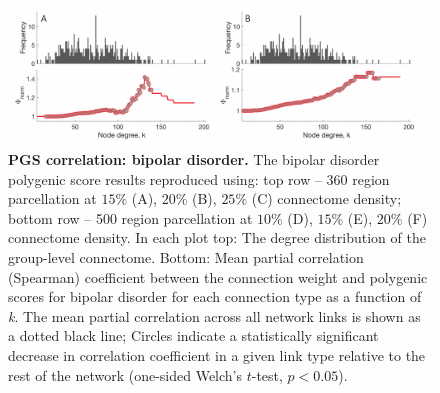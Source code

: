 \begin{figure}[h!]
\begin{center}
\includegraphics[width=1\textwidth]{Chapter5/SFigure5.pdf}%
\end{center}
\caption{\textbf{PGS correlation: bipolar disorder.}
The bipolar disorder polygenic score results reproduced using: top row -- 360 region parcellation at $15\%$ (A), $20\%$ (B), $25\%$ (C) connectome density; bottom row -- 500 region parcellation at $10\%$ (D), $15\%$ (E), $20\%$ (F) connectome density. In each plot top: The degree distribution of the group-level connectome. Bottom: Mean partial correlation (Spearman) coefficient between the connection weight and polygenic scores for bipolar disorder for each connection type as a function of \textit{k}. The mean partial correlation across all network links is shown as a dotted black line; Circles indicate a statistically significant decrease in correlation coefficient in a given link type relative to the rest of the network (one-sided Welch's $t$-test, $p < 0.05$).}
\label{fig:Ch5SFig5}
\end{figure}

